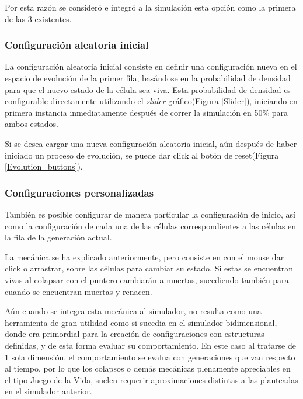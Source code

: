 \documentclass[]{article}
\begin{document}
			\hfill\break
			\justifying
			Por esta razón se consideró e integró a la simulación esta opción como la primera de las 3 existentes.
			
			\subsubsection{Configuración aleatoria inicial}
				\justifying
				La configuración aleatoria inicial consiste en definir una configuración nueva en el espacio de evolución de la primer fila, basándose en la probabilidad de densidad para que el nuevo estado de la célula sea viva. Esta probabilidad de densidad es configurable directamente utilizando el \textit{slider} gráfico(Figura \ref{Slider}), iniciando en primera instancia inmediatamente después de correr la simulación en 50\% para ambos estados.
				
				\hfill\break
				\justifying	
				Si se desea cargar una nueva configuración aleatoria inicial, aún después de haber iniciado un proceso de evolución, se puede dar click al botón de reset(Figura \ref{Evolution_buttons}).
			
			\subsubsection{Configuraciones personalizadas}
				\justifying
				También es posible configurar de manera particular la configuración de inicio, así como la configuración de cada una de las células correspondientes a las células en la fila de la generación actual.
				
				\hfill\break
				\justifying
				La mecánica se ha explicado anteriormente, pero consiste en con el mouse dar click o arrastrar, sobre las células para cambiar su estado. Si estas se encuentran vivas al colapsar con el puntero cambiarán a muertas, sucediendo también para cuando se encuentran muertas y renacen.
				
				\hfill\break
				\justifying
				Aún cuando se integra esta mecánica al simulador, no resulta como una herramienta de gran utilidad como si sucedia en el simulador bidimensional, donde era primordial para la creación de configuraciones con estructuras definidas, y de esta forma evaluar su comportamiento.
				En este caso al tratarse de 1 sola dimensión, el comportamiento se evalua con generaciones que van respecto al tiempo, por lo que los colapsos o demás mecánicas plenamente apreciables en el tipo Juego de la Vida, suelen requerir aproximaciones distintas a las planteadas en el simulador anterior.
				
\end{document}
